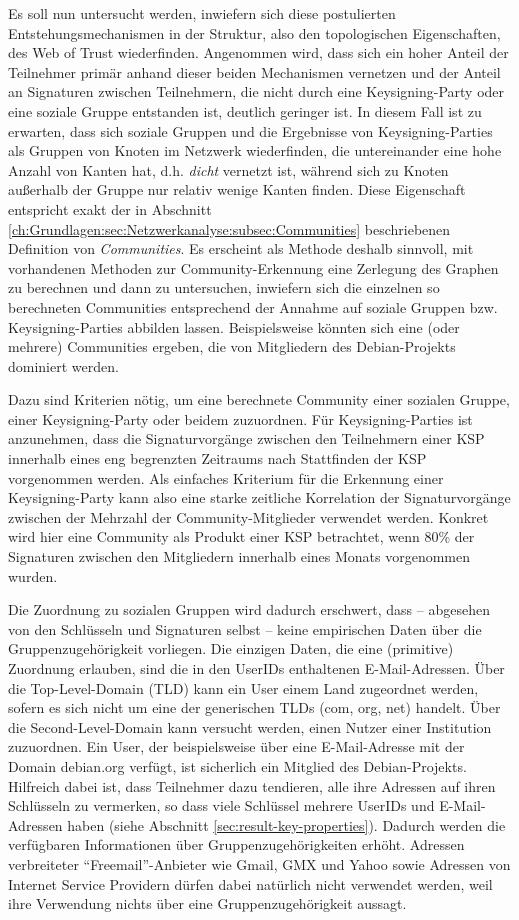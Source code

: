 Es soll nun untersucht werden, inwiefern sich diese postulierten
Entstehungsmechanismen in der Struktur, also den topologischen
Eigenschaften, des Web of Trust wiederfinden. Angenommen wird, dass
sich ein hoher Anteil der Teilnehmer primär anhand dieser beiden
Mechanismen vernetzen und der Anteil an Signaturen zwischen
Teilnehmern, die nicht durch eine Keysigning-Party oder eine soziale
Gruppe entstanden ist, deutlich geringer ist. In diesem Fall ist zu
erwarten, dass sich soziale Gruppen und die Ergebnisse von
Keysigning-Parties als Gruppen von Knoten im Netzwerk wiederfinden,
die untereinander eine hohe Anzahl von Kanten hat, d.h. \emph{dicht}
vernetzt ist, während sich zu Knoten außerhalb der Gruppe nur
relativ wenige Kanten finden. Diese Eigenschaft entspricht exakt der
in Abschnitt
\ref{ch:Grundlagen:sec:Netzwerkanalyse:subsec:Communities}
beschriebenen Definition von \emph{Communities}. Es erscheint als
Methode deshalb sinnvoll, mit vorhandenen Methoden zur
Community-Erkennung eine Zerlegung des Graphen zu berechnen und dann
zu untersuchen, inwiefern sich die einzelnen so berechneten
Communities entsprechend der Annahme auf soziale Gruppen
bzw. Keysigning-Parties abbilden lassen. Beispielsweise könnten sich
eine (oder mehrere) Communities ergeben, die von Mitgliedern des
Debian-Projekts dominiert werden.

Dazu sind Kriterien nötig, um eine berechnete Community einer
sozialen Gruppe, einer Keysigning-Party oder beidem zuzuordnen. Für
Keysigning-Parties ist anzunehmen, dass die Signaturvorgänge
zwischen den Teilnehmern einer KSP innerhalb eines eng begrenzten
Zeitraums nach Stattfinden der KSP vorgenommen werden. Als einfaches
Kriterium für die Erkennung einer Keysigning-Party kann also eine
starke zeitliche Korrelation der Signaturvorgänge zwischen der
Mehrzahl der Community-Mitglieder verwendet werden. Konkret wird hier
eine Community als Produkt einer KSP betrachtet, wenn 80\% der
Signaturen zwischen den Mitgliedern innerhalb eines Monats vorgenommen
wurden.



Die Zuordnung zu sozialen Gruppen wird dadurch erschwert, dass --
abgesehen von den Schlüsseln und Signaturen selbst -- keine
empirischen Daten über die Gruppenzugehörigkeit vorliegen. Die
einzigen Daten, die eine (primitive) Zuordnung erlauben, sind die in
den UserIDs enthaltenen E-Mail-Adressen. Über die Top-Level-Domain
(TLD) kann ein User einem Land zugeordnet werden, sofern es sich nicht
um eine der generischen TLDs (com, org, net) handelt. Über die
Second-Level-Domain kann versucht werden, einen Nutzer einer
Institution zuzuordnen. Ein User, der beispielsweise über eine
E-Mail-Adresse mit der Domain debian.org verfügt, ist sicherlich ein
Mitglied des Debian-Projekts. Hilfreich dabei ist, dass Teilnehmer
dazu tendieren, alle ihre Adressen auf ihren Schlüsseln zu
vermerken, so dass viele Schlüssel mehrere UserIDs und
E-Mail-Adressen haben (siehe Abschnitt
\ref{sec:result-key-properties}). Dadurch werden die verfügbaren
Informationen über Gruppenzugehörigkeiten erhöht. Adressen
verbreiteter ``Freemail''-Anbieter wie Gmail, GMX und Yahoo sowie
Adressen von Internet Service Providern dürfen dabei natürlich
nicht verwendet werden, weil ihre Verwendung nichts über eine
Gruppenzugehörigkeit aussagt.

